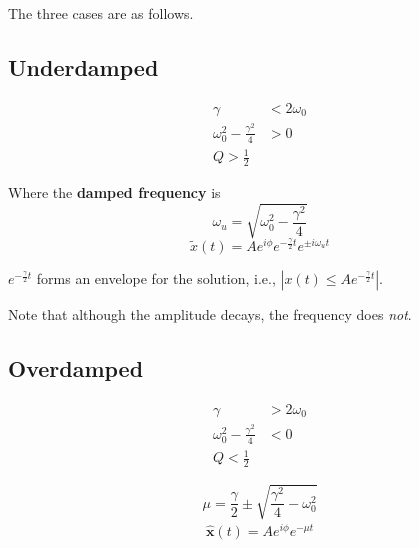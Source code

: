 \documentclass[a4paper, titlepage]{book}
\begin{document}
The three cases are as follows.

\subsection{Underdamped}

\begin{equation}
    \begin{aligned}
        \gamma                          &< 2 \omega_0 \\
        \omega_0^2 - \frac{\gamma^2}{4} &> 0 \\
        Q > \frac{1}{2}
    \end{aligned}
\end{equation}

Where the \textbf{damped frequency} is
\begin{equation}
    \omega_u = \sqrt{\omega_0^2 - \frac{\gamma^2}{4}}
\end{equation}
\begin{equation}
    \tilde{x}(t) = A e^{i\phi} e^{-\frac{\gamma}{2} t} e^{\pm i \omega_u t}
\end{equation}

\(e^{-\frac{\gamma}{2} t}\) forms an envelope for the solution,
i.e., \(\left|x(t) \le A e^{-\frac{\gamma}{2} t}\right|\).

Note that although the amplitude decays, the frequency does \emph{not}.

\subsection{Overdamped}

\begin{equation}
    \begin{aligned}
        \gamma                          &> 2 \omega_0 \\
        \omega_0^2 - \frac{\gamma^2}{4} &< 0 \\
        Q < \frac{1}{2}
    \end{aligned}
\end{equation}

\begin{equation}
    \mu = \frac{\gamma}{2} \pm \sqrt{\frac{\gamma^2}{4} - \omega_0^2}
\end{equation}
\begin{equation}
    \begin{aligned}
        \boldsymbol{\hat{x}}(t)
        = A e^{i \phi} e^{-\mu t}
    \end{aligned}
\end{equation}
\end{document}
